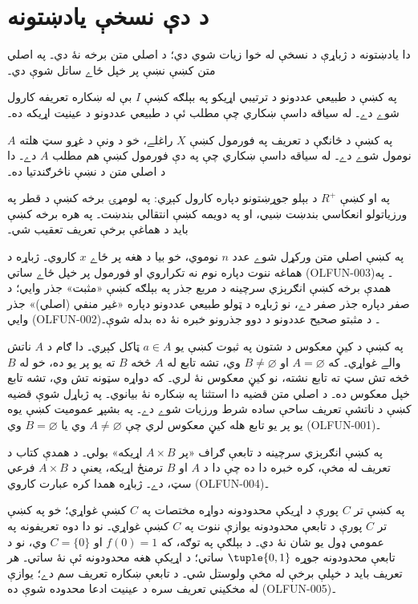 
\chapter*{د دې نسخې يادښتونه}
دا يادښتونه د ژباړې د نسخې له خوا زيات شوي دي؛ د اصلي متن برخه نۀ
دي۔ په اصلي متن کښې نښې پر خپل ځاے ساتل شوې دي۔

په  کښې د طبيعي عددونو د ترتيبي اړيکو په
بېلګه کښې $I$ بې له ښکاره تعريفه کارول شوے دے۔ له سياقه داسې
ښکاري چې مطلب ئې د طبيعي عددونو د عينيت اړيکه ده۔

په  کښې د څانګې د تعريف په فورمول کښې
$X$ راغلے، خو د ونې د غړو سټ هلته $A$ نومول شوے دے۔ له سياقه
داسې ښکاري چې په دې فورمول کښې هم مطلب $A$ دے۔ دا د اصلي متن د
نښې ناڅرګندتيا ده۔

په  او  کښې
$R^+$ د بېلو جوړښتونو دپاره کارول کېږي: په لومړۍ برخه کښې د قطر
په ورزياتولو انعکاسي بندښت ښيي، او په دويمه کښې انتقالي بندښت۔
په هره برخه کښې بايد د هماغې برخې تعريف تعقيب شي۔

په  کښې اصلي متن ورکړل شوے
عدد $n$ نوموي، خو بيا د هغه پر ځاے $x$ کاروي۔ ژباړه د هماغه
ننوت دپاره نوم نه تکراروي او فورمول پر خپل ځاے ساتي
(OLFUN-003)۔ په همدې برخه کښې انګرېزي سرچينه د مربع جذر په
بېلګه کښې «مثبت» جذر وايي؛ د صفر دپاره جذر صفر دے، نو ژباړه
د ټولو طبيعي عددونو دپاره «غير منفي (اصلي)» جذر وايي
(OLFUN-002)۔ د مثبتو صحيح عددونو د دوو جذرونو خبره نۀ ده بدله شوې۔

په  کښې د کيڼ معکوس د شتون په ثبوت کښې
يو $a \in A$ ټاکل کېږي۔ دا ګام د $A$ ناتش والے غواړي۔ که
$A=\varnothing$ او $B\ne\varnothing$ وي، تشه تابع له $A$ څخه $B$
ته يو پر يو ده، خو له $B$ څخه تش سټ ته تابع نشته، نو کيڼ معکوس
نۀ لري۔ که دواړه سټونه تش وي، تشه تابع خپل معکوس ده۔ د اصلي
متن قضيه دا استثنا په ښکاره نۀ بيانوي۔ په ژباړل شوې قضيه کښې
د ناتشې تعريف ساحې ساده شرط ورزيات شوے دے۔ په بشپړ عموميت کښې
يوه يو پر يو تابع هله کيڼ معکوس لري چې $A\ne\varnothing$ وي يا
$B=\varnothing$ وي (OLFUN-001)۔

په  کښې انګرېزي سرچينه د تابعې ګراف
«پر $A\times B$ اړيکه» بولي۔ د همدې کتاب د تعريف له مخې، کره خبره
دا ده چې دا د $A$ او $B$ ترمنځ اړيکه، يعنې د $A\times B$ فرعي
سټ، دے۔ ژباړه همدا کره عبارت کاروي (OLFUN-004)۔

په  کښې تر $C$ پورې د اړيکې محدودونه
دواړه مختصات په $C$ کښې غواړي؛ خو په 
کښې تر $C$ پورې د تابعې محدودونه يوازې ننوت په $C$ کښې غواړي۔
نو دا دوه تعريفونه په عمومي ډول يو شان نۀ دي۔ د بېلګې په توګه،
که $f(0)=1$ او $C=\{0\}$ وي، نو د تابعې محدودونه جوړه
$\tuple{0,1}$ ساتي؛ د اړيکې هغه محدودونه ئې نۀ ساتي۔ هر تعريف
بايد د خپلې برخې له مخې ولوستل شي۔ د تابعې ښکاره تعريف سم دے؛
يوازې له مخکيني تعريف سره د عينيت ادعا محدوده شوې ده (OLFUN-005)۔


